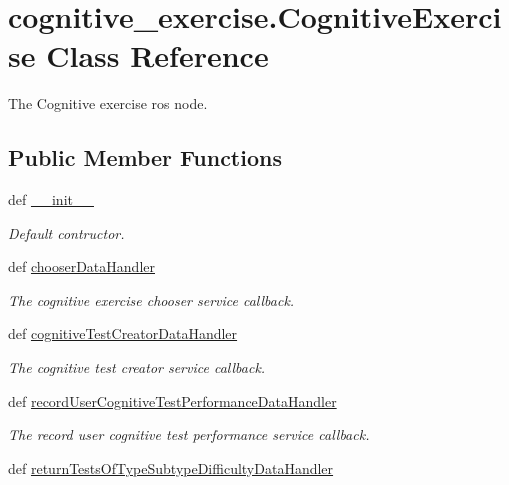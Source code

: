 \hypertarget{classcognitive__exercise_1_1CognitiveExercise}{\section{cognitive\-\_\-exercise.\-Cognitive\-Exercise Class Reference}
\label{classcognitive__exercise_1_1CognitiveExercise}
}


The Cognitive exercise ros node.  


\subsection*{Public Member Functions}
\begin{DoxyCompactItemize}
\item 
def \hyperlink{classcognitive__exercise_1_1CognitiveExercise_a3fca5be17a6fd570bd6eaf0f4685a9f3}{\-\_\-\-\_\-init\-\_\-\-\_\-}
\begin{DoxyCompactList}\small\item\em Default contructor. \end{DoxyCompactList}\item 
def \hyperlink{classcognitive__exercise_1_1CognitiveExercise_a9dd876bf454c882ff033d599de997e61}{chooser\-Data\-Handler}
\begin{DoxyCompactList}\small\item\em The cognitive exercise chooser service callback. \end{DoxyCompactList}\item 
def \hyperlink{classcognitive__exercise_1_1CognitiveExercise_ae1ad82c51b716e39d703ea97573248c3}{cognitive\-Test\-Creator\-Data\-Handler}
\begin{DoxyCompactList}\small\item\em The cognitive test creator service callback. \end{DoxyCompactList}\item 
def \hyperlink{classcognitive__exercise_1_1CognitiveExercise_a0a98592e9555de734115f584fac38928}{record\-User\-Cognitive\-Test\-Performance\-Data\-Handler}
\begin{DoxyCompactList}\small\item\em The record user cognitive test performance service callback. \end{DoxyCompactList}\item 
def \hyperlink{classcognitive__exercise_1_1CognitiveExercise_adee3b34d3abb7e1235a8e77db6fc9b4c}{return\-Tests\-Of\-Type\-Subtype\-Difficulty\-Data\-Handler}

\end{DoxyCompactItemize}
